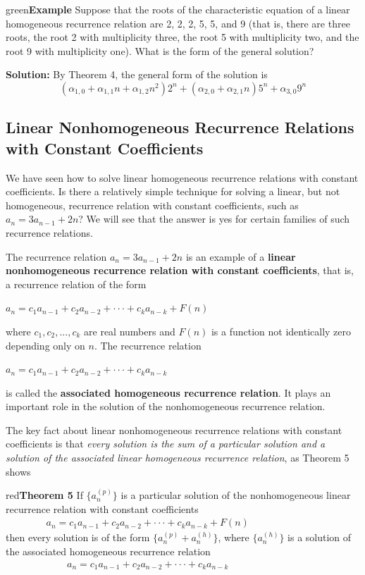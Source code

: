 \documentclass[11pt]{article}
\newenvironment{example}[1][\unskip]{\begin{mybox}{green}{\textbf{Example} {#1}}}{\end{mybox}}
\newenvironment{theorem}[1]{\begin{mybox}{red}{\textbf{Theorem #1}}}{\end{mybox}}
\begin{document}
\begin{example}
Suppose that the roots of the characteristic equation of a linear homogeneous recurrence relation are 2, 2, 2, 5, 5, and 9 (that is, there are three roots, the root 2 with multiplicity three, the root 5 with multiplicity two, and the root 9 with multiplicity one). What is the form of the general solution?

\textbf{Solution:} By Theorem 4, the general form of the solution is
\begin{equation*}
    (\alpha_{1,0} + \alpha_{1,1}n + \alpha_{1,2}n^2)2^n + (\alpha_{2,0} + \alpha_{2,1}n)5^n + \alpha_{3,0}9^n
\end{equation*}
\end{example}

\subsection{Linear Nonhomogeneous Recurrence Relations with Constant Coefficients}

We have seen how to solve linear homogeneous recurrence relations with constant coefficients. Is there a relatively simple technique for solving a linear, but not homogeneous, recurrence relation with constant coefficients, such as $a_n = 3a_{n-1} + 2n$? We will see that the answer is yes for certain families of such recurrence relations.

The recurrence relation $a_n = 3a_{n-1} + 2n$ is an example of a \textbf{linear nonhomogeneous recurrence relation with constant coefficients}, that is, a recurrence relation of the form

$a_n = c_1a_{n-1} + c_2a_{n-2} + \cdot \cdot \cdot + c_ka_{n-k} + F(n)$

where $c_1, c_2, ..., c_k$ are real numbers and $F(n)$ is a function not identically zero depending only on $n$. The recurrence relation

$a_n = c_1a_{n-1} + c_2a_{n-2} + \cdot \cdot \cdot + c_ka_{n-k}$

is called the \textbf{associated homogeneous recurrence relation}. It plays an important role in the solution of the nonhomogeneous recurrence relation.

The key fact about linear nonhomogeneous recurrence relations with constant coefficients is that \textit{every solution is the sum of a particular solution and a solution of the associated linear homogeneous recurrence relation}, as Theorem 5 shows

\begin{theorem}
{5}
If $\{a_n^{(p)}\}$ is a particular solution of the nonhomogeneous linear recurrence relation with constant coefficients
\begin{align*}
    a_n = c_1a_{n-1} + c_2a_{n-2} + \cdot \cdot \cdot + c_ka_{n-k} + F(n) & & & & & & & &  &
\end{align*}
then every solution is of the form $\{a_n^{(p)} + a_n^{(h)}\}$, where $\{a_n^{(h)}\}$ is a solution of the associated homogeneous recurrence relation
\begin{align*}
    a_n = c_1a_{n-1} + c_2a_{n-2} + \cdot \cdot \cdot + c_ka_{n-k} & & & & & & & &  &
\end{align*}
\end{theorem}
\end{document}
